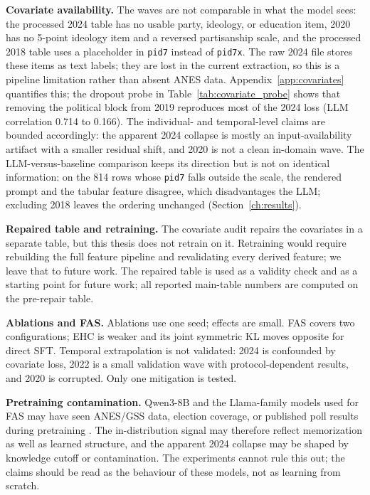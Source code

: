 \textbf{Covariate availability.} The waves are not comparable in what the model
sees: the processed 2024 table has no usable party, ideology, or education item, 2020 has no 5-point ideology item
and a reversed partisanship scale, and the processed 2018 table uses a
placeholder in \texttt{pid7} instead of \texttt{pid7x}.
The raw 2024 file stores these items as text labels; they are lost in the current extraction, so this is a pipeline limitation rather than absent ANES data. Appendix~\ref{app:covariates} quantifies this; the dropout probe in
Table~\ref{tab:covariate_probe} shows that removing the political block from
2019 reproduces most of the 2024 loss (LLM correlation 0.714 to 0.166). The
individual- and temporal-level claims are bounded accordingly: the apparent 2024 collapse
is mostly an input-availability artifact with a smaller residual shift, and 2020
is not a clean in-domain wave. The LLM-versus-baseline comparison keeps its
direction but is not on identical information: on the 814 rows whose
\texttt{pid7} falls outside the scale, the rendered prompt and the tabular
feature disagree, which disadvantages the LLM; excluding 2018 leaves the
ordering unchanged (Section~\ref{ch:results}).

\textbf{Repaired table and retraining.} The covariate audit repairs the
covariates in a separate table, but this thesis does not retrain on it.
Retraining would require rebuilding the full feature pipeline and revalidating
every derived feature; we leave that to future work. The repaired table is used
as a validity check and as a starting point for future work; all reported
main-table numbers are computed on the pre-repair table.

\textbf{Ablations and FAS.} Ablations use one seed; effects are small. FAS covers
two configurations; EHC is weaker and its joint symmetric KL moves opposite for
direct SFT. Temporal extrapolation is not validated: 2024 is confounded by
covariate loss, 2022 is a small validation wave with protocol-dependent results,
and 2020 is corrupted. Only one mitigation is tested.

\textbf{Pretraining contamination.} Qwen3-8B and the Llama-family models used for
FAS may have seen ANES/GSS data, election coverage, or published poll results
during pretraining \citep{bender2021stochastic}. The in-distribution signal may therefore reflect memorization
as well as learned structure, and the apparent 2024 collapse may be shaped by knowledge
cutoff or contamination. The experiments cannot rule this out; the claims should
be read as the behaviour of these models, not as learning from scratch.

